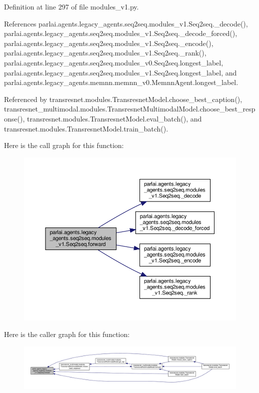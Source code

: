 Definition at line 297 of file modules\+\_\+v1.\+py.



References parlai.\+agents.\+legacy\+\_\+agents.\+seq2seq.\+modules\+\_\+v1.\+Seq2seq.\+\_\+decode(), parlai.\+agents.\+legacy\+\_\+agents.\+seq2seq.\+modules\+\_\+v1.\+Seq2seq.\+\_\+decode\+\_\+forced(), parlai.\+agents.\+legacy\+\_\+agents.\+seq2seq.\+modules\+\_\+v1.\+Seq2seq.\+\_\+encode(), parlai.\+agents.\+legacy\+\_\+agents.\+seq2seq.\+modules\+\_\+v1.\+Seq2seq.\+\_\+rank(), parlai.\+agents.\+legacy\+\_\+agents.\+seq2seq.\+modules\+\_\+v0.\+Seq2seq.\+longest\+\_\+label, parlai.\+agents.\+legacy\+\_\+agents.\+seq2seq.\+modules\+\_\+v1.\+Seq2seq.\+longest\+\_\+label, and parlai.\+agents.\+legacy\+\_\+agents.\+memnn.\+memnn\+\_\+v0.\+Memnn\+Agent.\+longest\+\_\+label.



Referenced by transresnet.\+modules.\+Transresnet\+Model.\+choose\+\_\+best\+\_\+caption(), transresnet\+\_\+multimodal.\+modules.\+Transresnet\+Multimodal\+Model.\+choose\+\_\+best\+\_\+response(), transresnet.\+modules.\+Transresnet\+Model.\+eval\+\_\+batch(), and transresnet.\+modules.\+Transresnet\+Model.\+train\+\_\+batch().

Here is the call graph for this function\+:
\nopagebreak
\begin{figure}[H]
\begin{center}
\leavevmode
\includegraphics[width=350pt]{classparlai_1_1agents_1_1legacy__agents_1_1seq2seq_1_1modules__v1_1_1Seq2seq_a59af567499dfa8e60ccc185391143d41_cgraph}
\end{center}
\end{figure}
Here is the caller graph for this function\+:
\nopagebreak
\begin{figure}[H]
\begin{center}
\leavevmode
\includegraphics[width=350pt]{classparlai_1_1agents_1_1legacy__agents_1_1seq2seq_1_1modules__v1_1_1Seq2seq_a59af567499dfa8e60ccc185391143d41_icgraph}
\end{center}
\end{figure}


